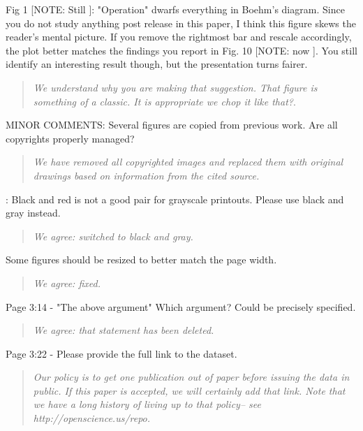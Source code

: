  
Fig 1 [NOTE: Still ]: "Operation" dwarfs everything in Boehm's diagram.
Since you do not study anything post release in this paper,
I think this figure skews the reader's mental picture. If
you remove the rightmost bar and rescale accordingly, the
plot better matches the findings you report in Fig. 10 [NOTE: now ]. You
still identify an interesting result though, but the
presentation turns fairer. 

\begin{quote}{\em We understand why you are making that suggestion.
That figure is something of a classic. It is appropriate we chop it like that?}.
\end{quote}

MINOR COMMENTS: 
Several figures are copied from previous work. Are all copyrights properly
managed?  

\begin{quote}{\em We have removed all copyrighted images and replaced them with original drawings based on information from the cited source.}\end{quote}

 

: Black and red is not a good pair for
grayscale printouts. Please use black and gray instead.
\begin{quote}{\em  We agree: switched to black and gray.  }\end{quote}

 
 
Some figures should be resized to better match the page width.  
 

\begin{quote}{\em  We agree: fixed. }\end{quote}


 
Page 3:14 - "The above argument" Which argument? Could be precisely specified.
 

\begin{quote}{\em  We agree: that statement has been deleted. }\end{quote}
 
Page 3:22 - Please provide the full link to the dataset.
 
\begin{quote}{\em  Our policy is to get one publication out of paper
before issuing the data in public. If this paper is accepted, we will certainly add that link. Note that we have a long history of living up to that policy-- see http://openscience.us/repo. }\end{quote}  

